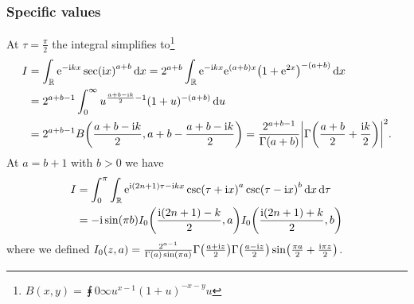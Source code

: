 \documentclass[english, parskip=full]{scrartcl}
\begin{document}
\subsubsection{Specific values}
At $\tau = \frac{\pi}{2}$ the integral simplifies to\footnote{$B(x,y) = \intx{0}{\infty}{u^{x-1} (1+u)^{-x-y}}{u}$}
\begin{align}
I &= \intr{\powe{-\i kx} \sec(\i x)^{a+b}}{x} = 2^{a+b} \intr{\powe{-\i kx} \powe{(a+b)x} \kla*{1 + \powe{2 x}}^{-(a+b)} }{x}\\
&= 2^{a+b-1} \intx{0}{\infty}{u^{\frac{a+b-\i k}{2}-1} (1+u)^{-(a+b)}}{u}\\
&= 2^{a+b-1} B\kla*{\frac{a+b-\i k}{2}, a+b-\frac{a+b-\i k}{2}} = \frac{2^{a+b-1}}{\Gamma(a+b)} \abs*{\Gamma\kla*{\frac{a+b}{2} + \frac{\i k}{2}}}^2.
\end{align}
At $a=b+1$ with $b>0$ we have
\begin{align}
I &= \intx{0}{\pi}{\intr{\powe{\i (2n+1)\tau - \i kx} \csc\kla*{\tau + \i x}^a \csc\kla*{\tau - \i x}^b}{x} }{\tau} \\
&= -\i \sin\kla*{\pi b} I_0\kla*{\frac{\i (2n+1) - k}{2}, a} I_0\kla*{\frac{\i(2n+1) + k}{2}, b}
\end{align}
where we defined $I_0(z,a) = \frac{2^{a-1}}{\Gamma(a) \sin(\pi a)} \Gamma\kla*{\frac{a+\i z}{2}} \Gamma\kla*{\frac{a - \i z}{2}} \sin\kla*{\frac{\pi a}{2} + \frac{\i \pi z}{2}}$.
\end{document}
